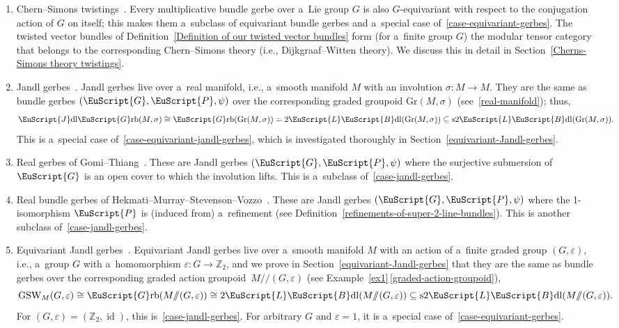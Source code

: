 \documentclass[10pt,a4paper]{amsart}
\numberwithin{equation}{section}
\def\mathscr#1{\EuScript{#1}}
\def\Z {\mathbb{Z}}
\def\subset{\subseteq}
\def\act#1#2{#1/\!\!/#2}
\newcommand{\id}{\operatorname{id}}
\newcommand{\LineBdl}{\mathscr{L}\mathscr{B}\mathrm{dl}}
\newcommand{\twoLineBdl}{2\LineBdl}
\newcommand{\stwoLineBdl}{\mathrm{s}2\LineBdl}
\newcommand{\Grb}{\mathscr{G}\mathrm{rb}}
\def\Gr{\mathrm{Gr}}
\begin{document}
\begin{enumerate}[(1)]
\item
Chern--Simons twistings~\cite{freed6}.
Every multiplicative bundle gerbe over a~Lie group $G$ is also $G$-equivariant with respect to the conjugation action of $G$ on itself; this makes them a~subclass of equivariant bundle gerbes and a~special case of~\ref{case-equivariant-gerbes}. The twisted vector bundles of Definition~\ref{Definition of our twisted vector bundles} form (for a~finite group $G$) the modular tensor category that belongs to the corresponding Chern--Simons theory (i.e., Dijkgraaf--Witten theory). We discuss this in detail in Section~\ref{Cherns-Simons theory twistings}.


\item
\label{case-jandl-gerbes}
Jandl gerbes~\cite{schreiber1}.
Jandl gerbes live over a~real manifold, i.e., a~smooth manifold $M$ with an involution $\sigma\colon M \to M$. They are the same as bundle gerbes $(\mathscr{G},\mathscr{P},\psi)$ over the corresponding graded groupoid $\Gr(M,\sigma)$ (see~\ref{real-manifold}); thus,
\begin{equation*}
\mathscr{J}\mathrm{dl}\Grb(M,\sigma)\cong\Grb(\Gr(M,\sigma))=\twoLineBdl(\Gr(M,\sigma))\subset \stwoLineBdl(\Gr(M,\sigma)).
\end{equation*}
This is a~special case of~\ref{case-equivariant-jandl-gerbes}, which is investigated thoroughly in Section~\ref{equivariant-Jandl-gerbes}.


\item
Real gerbes of Gomi--Thiang~\cite{Gomi2021}.
These are Jandl gerbes $(\mathscr{G},\mathscr{P},\psi)$ where the surjective submersion of $\mathscr{G}$ is an open cover to which the involution lifts. This is a~subclass of~\ref{case-jandl-gerbes}.


\item
\label{Real-bundle-gerbes}
Real bundle gerbes of Hekmati--Murray--Stevenson--Vozzo~\cite{Hekmati}.
These are Jandl gerbes $(\mathscr{G},\mathscr{P},\psi)$ where the 1-isomorphism $\mathscr{P}$ is (induced from) a~refinement (see Definition~\ref{refinements-of-super-2-line-bundles}). This is another subclass of~\ref{case-jandl-gerbes}.

\item
\label{case-equivariant-jandl-gerbes}
Equivariant Jandl gerbes~\cite{gawedzki8}.
Equivariant Jandl gerbes live over a~smooth manifold $M$ with an action of a~finite graded group $(G,\varepsilon)$, i.e., a~group $G$ with a~homomorphism $\varepsilon\colon G \to \Z_2$, and we prove in Section~\ref{equivariant-Jandl-gerbes} that they are the same as bundle gerbes over the corresponding graded action groupoid~${\act M{(G,\varepsilon)}}$ (see Example~\ref{ex1}\,\ref{graded-action-groupoid}),
\begin{equation*}
\mathrm{GSW}_M(G,\varepsilon)\cong\Grb(\act M{(G,\varepsilon)}) \cong \twoLineBdl(\act M{(G,\varepsilon)}) \subset \stwoLineBdl(\act M{(G,\varepsilon)}).
\end{equation*}
For $(G,\varepsilon)=(\Z_2,\id)$, this is~\ref{case-jandl-gerbes}. For arbitrary $G$ and $\varepsilon=1$, it is a~special case of~\ref{case-equivariant-gerbes}.


\end{enumerate}
\end{document}

